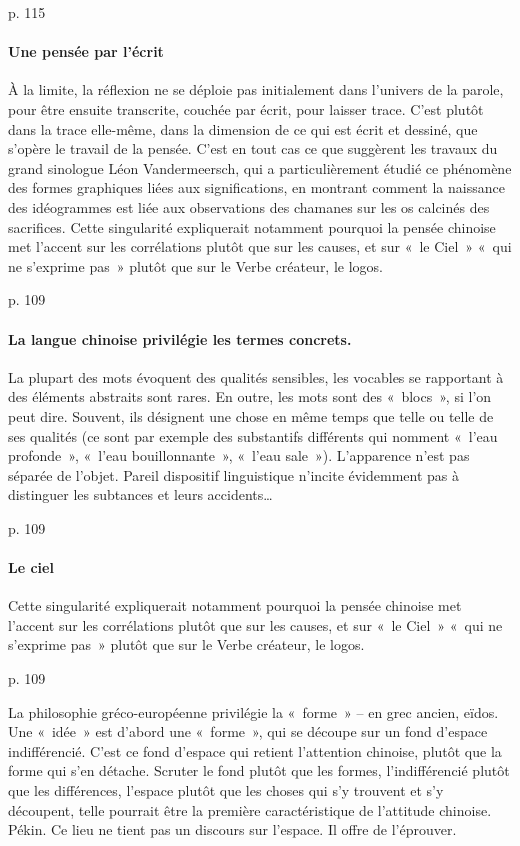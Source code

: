 \cite{PolDroit:voyage} p. 115 


\paragraph{Une pensée par l'écrit} À la limite, la réflexion ne se déploie pas initialement dans l’univers de la parole, pour être ensuite transcrite, couchée par écrit, pour laisser trace. C’est plutôt dans la trace elle-même, dans la dimension de ce qui est écrit et dessiné, que s’opère le travail de la pensée. C’est en tout cas ce que suggèrent les travaux du grand sinologue Léon Vandermeersch, qui a particulièrement étudié ce phénomène des formes graphiques liées aux significations, en montrant comment la naissance des idéogrammes est liée aux observations des chamanes sur les os calcinés des sacrifices. Cette singularité expliquerait notamment pourquoi la pensée chinoise met l’accent sur les corrélations plutôt que sur les causes, et sur « le Ciel » « qui ne s’exprime pas » plutôt que sur le Verbe créateur, le logos.

 

\cite{PolDroit:voyage} p. 109 

\paragraph{La langue chinoise privilégie les termes concrets. } La plupart des mots évoquent des qualités sensibles, les vocables se rapportant à des éléments abstraits sont rares. En outre, les mots sont des « blocs », si l’on peut dire. Souvent, ils désignent une chose en même temps que telle ou telle de ses qualités (ce sont par exemple des substantifs différents qui nomment « l’eau profonde », « l’eau bouillonnante », « l’eau sale »). L’apparence n’est pas séparée de l’objet. Pareil dispositif linguistique n’incite évidemment pas à distinguer les subtances et leurs accidents…
 

\cite{PolDroit:voyage} p. 109 


\paragraph{Le ciel} Cette singularité expliquerait notamment pourquoi la pensée chinoise met l’accent sur les corrélations plutôt que sur les causes, et sur « le Ciel » « qui ne s’exprime pas » plutôt que sur le Verbe créateur, le logos.

\cite{PolDroit:voyage} p. 109 

La philosophie gréco-européenne privilégie la « forme » – en grec ancien, eïdos. Une « idée » est d’abord une « forme », qui se découpe sur un fond d’espace indifférencié. C’est ce fond d’espace qui retient l’attention chinoise, plutôt que la forme qui s’en détache. Scruter le fond plutôt que les formes, l’indifférencié plutôt que les différences, l’espace plutôt que les choses qui s’y trouvent et s’y découpent, telle pourrait être la première caractéristique de l’attitude chinoise.
Pékin. Ce lieu ne tient pas un discours sur l’espace. Il offre de l’éprouver.


